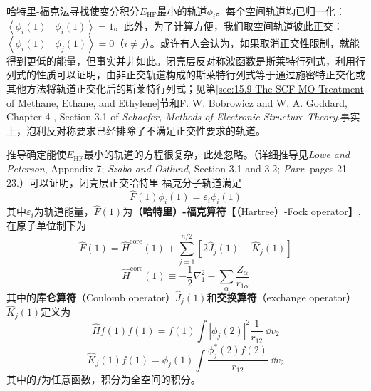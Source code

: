     哈特里-福克法寻找使变分积分$E_{\text{HF}}$最小的轨道$\phi_i$。每个空间轨道均已归一化：$\left\langle \phi_i\left(1\right) \middle| \phi_i\left(1\right) \right\rangle = 1$。此外，为了计算方便，我们取空间轨道彼此正交：$\left\langle \phi_i\left(1\right) \middle| \phi_j\left(1\right) \right\rangle = 0$（$i \neq j$）。或许有人会认为，如果取消正交性限制，就能得到更低的能量，但事实并非如此。闭壳层反对称波函数是斯莱特行列式，利用行列式的性质可以证明，由非正交轨道构成的斯莱特行列式等于通过施密特正交化或其他方法将轨道正交化后的斯莱特行列式；见第\ref{sec:15.9 The SCF MO Treatment of Methane, Ethane, and Ethylene}节和F. W. Bobrowicz and W. A. Goddard, Chapter 4 , Section 3.1 of \textit{Schaefer, Methods of Electronic Structure Theory}.事实上，泡利反对称要求已经排除了不满足正交性要求的轨道。

    推导确定能使$E_{\text{HF}}$最小的轨道的方程很复杂，此处忽略。（详细推导见\textit{Lowe and Peterson}, Appendix 7; \textit{Szabo and Ostlund}, Section 3.1 and 3.2; \textit{Parr}, pages 21-23.）可以证明，闭壳层正交哈特里-福克分子轨道满足
    \begin{equation}
        \hat{F}\left(1\right) \phi_i\left(1\right) = \varepsilon_i \phi_i\left(1\right)
        \label{eq:14.25}
    \end{equation}
    其中$\varepsilon_i$为轨道能量，$\hat{F}\left(1\right)$为\textbf{（哈特里）-福克算符}【（Hartree）-Fock operator】,在原子单位制下为
    \begin{equation}
        \hat{F}\left(1\right) = \hat{H}^{\text{core}}\left(1\right) + \sum_{j=1}^{n/2}\left[2\hat{J}_j\left(1\right) - \hat{K}_j\left(1\right)\right]
        \label{eq:14.26}
    \end{equation}
    \begin{equation}
        \hat{H}^{\text{core}}\left(1\right) \equiv -\frac{1}{2} \nabla_1^2 - \sum_{\alpha} \frac{Z_{\alpha}}{r_{1\alpha}}
        \label{eq:14.27}
    \end{equation}
    其中的\textbf{库仑算符}（Coulomb operator）$\hat{J}_j\left(1\right)$和\textbf{交换算符}（exchange operator）$\hat{K}_j\left(1\right)$定义为
    \begin{equation}
        \hat{H}f\left(1\right)f\left(1\right) = f\left(1\right) \int \left|\phi_j\left(2\right)\right|^2 \frac{1}{r_{12}} \:\dd v_2
        \label{eq:14.28}
    \end{equation}
    \begin{equation}
        \hat{K}_j\left(1\right) f\left(1\right) = \phi_j\left(1\right) \int \frac{\phi_j^*\left(2\right) f\left(2\right)}{r_{12}} \:\dd v_2
        \label{eq:14.29}
    \end{equation}
    其中的$f$为任意函数，积分为全空间的积分。

